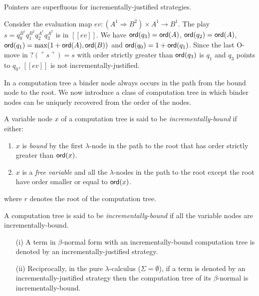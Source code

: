\documentclass{llncs}
\newcommand\ord[1]{{\sf ord}(#1)}
\newcommand{\lsem}{[\![} %
\newcommand{\rsem}{]\!]} %
\newcommand{\sem}[1]{{\lsem #1 \rsem}}
\newcommand{\pview}[1]{\ulcorner #1 \urcorner}
\begin{document}
\begin{lemma}
\label{lem:incrjustified_pointers_uniqu_recover} Pointers are
superfluous for incrementally-justified strategies.
\end{lemma}

\begin{example}
Consider the evaluation map $ev : (A^1 \Rightarrow B^2) \times  A^1 \rightarrow B^1$.
The play $s = q_0^{B^1} q_1^{B^2} q_2^{A^1} q_3^{A^2}$ is in $\sem{ev}$. We have $\ord{q_3} = \ord{A}$,
$\ord{q_2} = \ord{A}$, $\ord{q_1} = \max( 1+\ord{A}, \ord{B})$ and
$\ord{q_0} = 1 + \ord{q_1}$. Since the last O-move in $?(\pview{s})= s$
with order strictly greater than $\ord{q_3}$ is $q_1$ and $q_3$ points to $q_0$, $\sem{ev}$ is not incrementally-justified.
\end{example}


In a computation tree a binder node always occurs in the path from
the bound node to the root. We now introduce a class of computation
tree in which binder nodes can be uniquely recovered from the order
of the nodes. 
\begin{definition}
A variable node $x$ of a computation tree is said to be
\emph{incrementally-bound} if either:
\begin{enumerate}
\item $x$ is \emph{bound} by the first $\lambda$-node in the path to the root that has
order strictly greater than $\ord{x}$.
\item $x$ is a \emph{free variable} and all the $\lambda$-nodes in the path to the root except the root have order
smaller or equal to $\ord{x}$.
\end{enumerate}
where $r$ denotes the root of the computation tree.

A computation tree is said to be \emph{incrementally-bound} if all
the variable nodes are incrementally-bound.
\end{definition}

\begin{proposition}
\label{prop:incrbound_imp_incrjustified}
\begin{enumerate}
\item[(i)] A term in $\beta$-normal form with an incrementally-bound computation tree is denoted by an incrementally-justified strategy.
\item[(ii)] Reciprocally, in the pure $\lambda$-calculus ($\Sigma=\emptyset$), if a term is denoted by an incrementally-justified strategy then the computation tree of its $\beta$-normal is incrementally-bound.
\end{enumerate}
\end{proposition}
\end{document}
